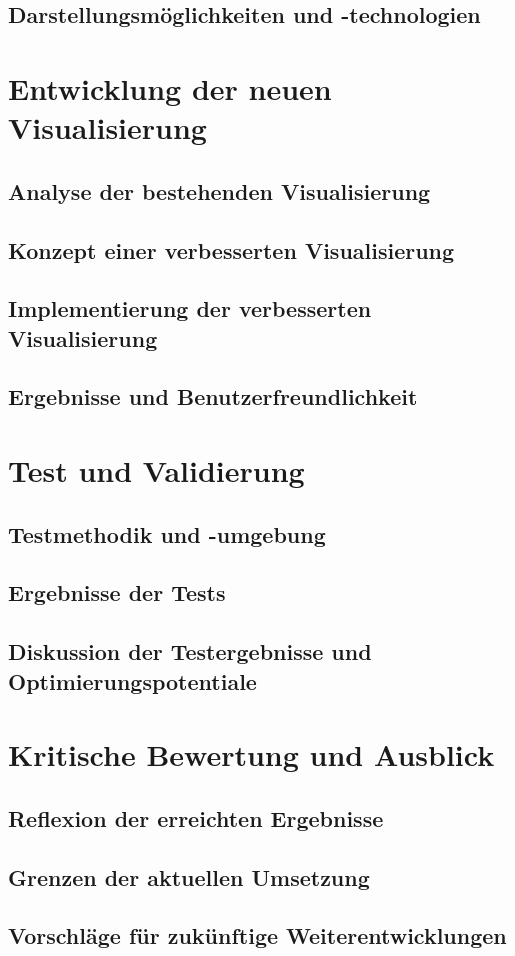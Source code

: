 \documentclass[a4paper, 12pt]{article} %
\begin{document}
\subsection{Darstellungsmöglichkeiten und -technologien}

\section{Entwicklung der neuen Visualisierung}
\subsection{Analyse der bestehenden Visualisierung}
\subsection{Konzept einer verbesserten Visualisierung}
\subsection{Implementierung der verbesserten Visualisierung}
\subsection{Ergebnisse und Benutzerfreundlichkeit}

\section{Test und Validierung}
\subsection{Testmethodik und -umgebung}
\subsection{Ergebnisse der Tests}
\subsection{Diskussion der Testergebnisse und Optimierungspotentiale}

\section{Kritische Bewertung und Ausblick}
\subsection{Reflexion der erreichten Ergebnisse}
\subsection{Grenzen der aktuellen Umsetzung}
\subsection{Vorschläge für zukünftige Weiterentwicklungen}


\clearpage
\begingroup
\renewcommand{\bibfont}{\fontsize{13pt}{12pt}\selectfont}  
\sloppy
\nocite{*}
\printbibliography
\endgroup
\end{document}
